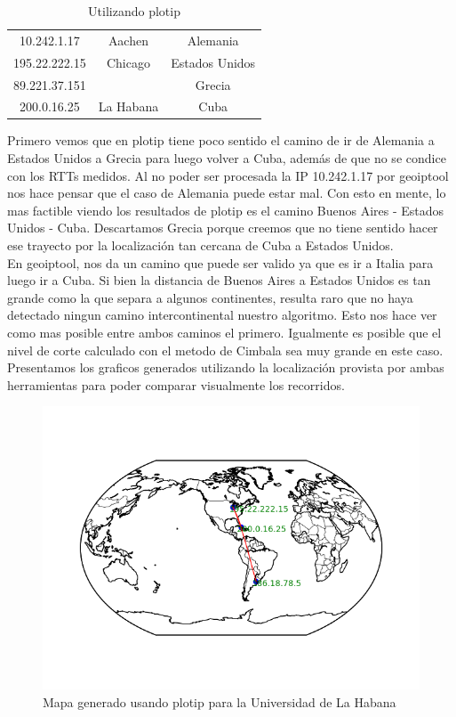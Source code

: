 \begin{table}
\centering
\begin{tabular}{|c|c|c|}
10.242.1.17 & Aachen & Alemania \\
195.22.222.15 & Chicago & Estados Unidos  \\
89.221.37.151 &  & Grecia \\
200.0.16.25 & La Habana & Cuba \\
\end{tabular}
\caption{Utilizando plotip}
\end{table}

Primero vemos que en plotip tiene poco sentido el camino de ir de Alemania a Estados Unidos a Grecia para luego volver a Cuba, adem\'as de que no se condice con los RTTs medidos. Al no poder ser procesada la IP 10.242.1.17 por geoiptool nos hace pensar que el caso de Alemania puede estar mal. Con esto en mente, lo mas factible viendo los resultados de plotip es el camino Buenos Aires - Estados Unidos - Cuba. Descartamos Grecia porque creemos que no tiene sentido hacer ese trayecto por la localizaci\'on tan cercana de Cuba a Estados Unidos.\\

En geoiptool, nos da un camino que puede ser valido ya que es ir a Italia para luego ir a Cuba. Si bien la distancia de Buenos Aires a Estados Unidos es tan grande como la que separa a algunos continentes, resulta raro que no haya detectado ningun camino intercontinental nuestro algoritmo. Esto nos hace ver como mas posible entre ambos caminos el primero. Igualmente es posible que el nivel de corte calculado con el metodo de Cimbala sea muy grande en este caso.\\

Presentamos los graficos generados utilizando la localizaci\'on provista por ambas herramientas para poder comparar visualmente los recorridos.

\begin{figure}
	\centering
 	\includegraphics[scale=0.8]{imagenes/mapa_cuba_2.png}
 	\caption{Mapa generado usando plotip para la Universidad de La Habana}
\end{figure} 

